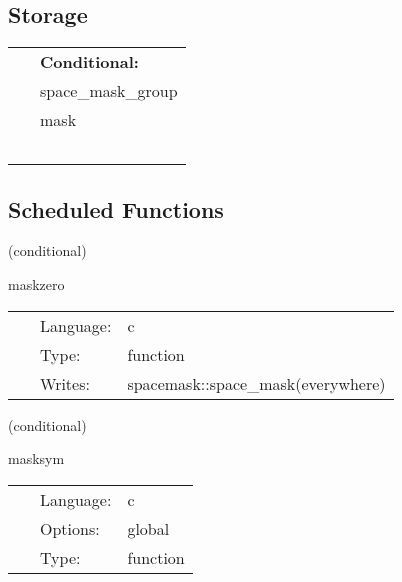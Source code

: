 \documentclass{article}
\begin{document}
\subsection*{Storage}

\hspace{5mm}

 \begin{tabular*}{160mm}{ll} 
~& {\bf Conditional:} \\ 
~ &  space\_mask\_group\\ 
~ &  mask\\ 
~ & ~\\ 
\end{tabular*} 


\subsection*{Scheduled Functions}
\vspace{5mm}

   (conditional) 

\hspace{5mm} maskzero 

\hspace{5mm}{\it initialise mask to zero } 


\hspace{5mm}

 \begin{tabular*}{160mm}{cll} 
~ & Language:  & c \\ 
~ & Type:  & function \\ 
~ & Writes:  & spacemask::space\_mask(everywhere) \\ 
\end{tabular*} 


\vspace{5mm}

   (conditional) 

\hspace{5mm} masksym 

\hspace{5mm}{\it set grid symmetries for mask } 


\hspace{5mm}

 \begin{tabular*}{160mm}{cll} 
~ & Language:  & c \\ 
~ & Options:  & global \\ 
~ & Type:  & function \\ 
\end{tabular*} 
\end{document}
